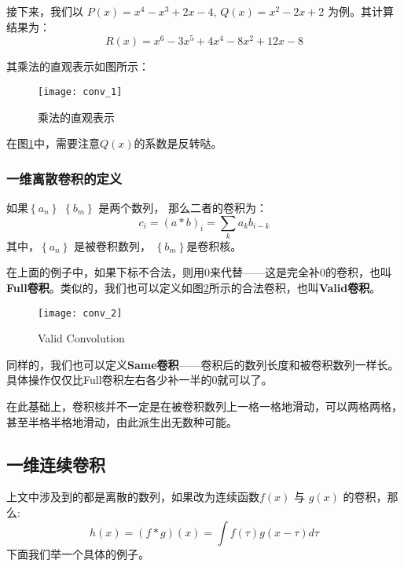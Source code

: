 		接下来，我们以 $P\left(x\right) = x^4 -x^3 +2x -4$, $Q\left(x\right) = x^2 -2x +2$ 为例。其计算结果为：$$R\left(x\right) = x^6 -3x^5 + 4x^4 -8x^2+12x-8$$
		
		其乘法的直观表示如图所示：
		\begin{figure}[!htbp]
			\centering
			\texttt{[image: conv\_1]}
			\caption{乘法的直观表示}
			\label{fig:1}
		\end{figure}
		
		在图\ref{fig:1}中，需要注意$Q\left(x\right)$的系数是反转哒。
		
		\subsubsection{一维离散卷积的定义}
		\begin{definition}
			如果$\left\{a_n\right\}$ $\left\{b_m\right\}$ 是两个数列， 那么二者的卷积为：
			$$c_i = \left(a * b\right) _i = \sum_k a_k b_{i-k}$$
			其中，$\left\{a_n\right\}$ 是被卷积数列， $\left\{b_m\right\}$是卷积核。
		\end{definition}
	
		在上面的例子中，如果下标不合法，则用0来代替——这是完全补0的卷积，也叫\textbf{Full卷积}。类似的，我们也可以定义如图\ref{fig:2}所示的合法卷积，也叫\textbf{Valid卷积}。
		
		\begin{figure}[!htbp]
			\centering
			\texttt{[image: conv\_2]}
			\caption{Valid Convolution}
			\label{fig:2}
		\end{figure}
	
		同样的，我们也可以定义\textbf{Same卷积}——卷积后的数列长度和被卷积数列一样长。具体操作仅仅比Full卷积左右各少补一半的0就可以了。
		
		在此基础上，卷积核并不一定是在被卷积数列上一格一格地滑动，可以两格两格，甚至半格半格地滑动，由此派生出无数种可能\cite{RN2}。
	\subsection{一维连续卷积}
		
		上文中涉及到的都是离散的数列，如果改为连续函数$f\left(x\right)$ 与 $g\left(x\right)$ 的卷积，那么:
        \begin{equation}
            h\left(x\right) = \left( f*g \right) \left(x\right) = \int {f\left(\tau \right) g\left(x-\tau \right)d\tau}
            \label{eq:3}
        \end{equation}
        下面我们举一个具体的例子。
        
